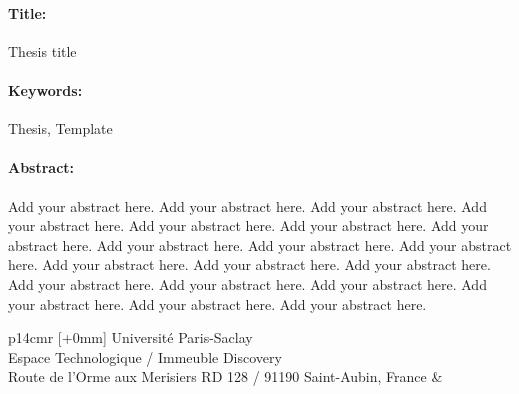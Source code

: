 \documentclass[12pt,a4paper]{book}
\begin{document}
\begin{mdframed}[linecolor=Prune,linewidth=1]
\vspace{-.25cm}
\paragraph*{Title:} Thesis title 

\begin{small}
\vspace{-.25cm}
\paragraph*{Keywords:} Thesis, Template

\vspace{-.5cm}
\begin{multicols}{2}
\paragraph*{Abstract:} Add your abstract here.  Add your abstract here. Add your abstract here. Add your abstract here. Add your abstract here. Add your abstract here. Add your abstract here. Add your abstract here. Add your abstract here. Add your abstract here. Add your abstract here. Add your abstract here. Add your abstract here. Add your abstract here. Add your abstract here. Add your abstract here. Add your abstract here. Add your abstract here. Add your abstract here.
\end{multicols}
\end{small}
\end{mdframed}

\vspace{3cm} %
\selectfont
\begin{tabular}{p{14cm}r}
[+0mm]{{\color{Prune} Université Paris-Saclay\\
Espace Technologique / Immeuble Discovery\\
Route de l’Orme aux Merisiers RD 128 / 91190 Saint-Aubin, France}} & \\%
\end{tabular}
\end{document}
